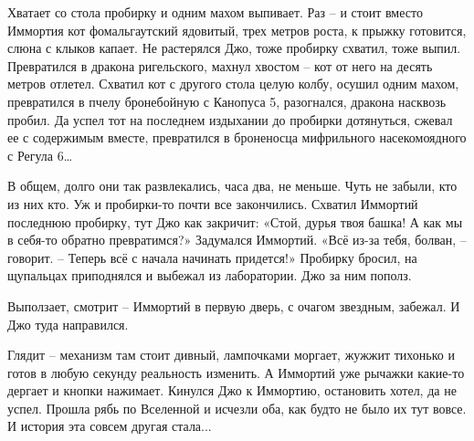 \documentclass[ebook,oneside,final,openright]{memoir}
\begin{document}
\par
Хватает со стола пробирку и одним махом выпивает. Раз – и стоит вместо Иммортия кот фомальгаутский ядовитый, трех метров роста, к прыжку готовится, слюна с клыков капает. Не растерялся Джо, тоже пробирку схватил, тоже выпил. Превратился в дракона ригельского, махнул хвостом – кот от него на десять метров отлетел. Схватил кот с другого стола целую колбу, осушил одним махом, превратился в пчелу бронебойную с Канопуса 5, разогнался, дракона насквозь пробил. Да успел тот на последнем издыхании до пробирки дотянуться, сжевал ее с содержимым вместе, превратился в броненосца мифрильного насекомоядного с Регула 6…\par
\par
В общем, долго они так развлекались, часа два, не меньше. Чуть не забыли, кто из них кто. Уж и пробирки-то почти все закончились. Схватил Иммортий последнюю пробирку, тут Джо как закричит: «Стой, дурья твоя башка! А как мы в себя-то обратно превратимся?» Задумался Иммортий. «Всё из-за тебя, болван, – говорит. – Теперь всё с начала начинать придется!» Пробирку бросил, на щупальцах приподнялся и выбежал из лаборатории. Джо за ним пополз.\par
\par
Выползает, смотрит – Иммортий в первую дверь, с очагом звездным, забежал. И Джо туда направился.\par
\par
Глядит – механизм там стоит дивный, лампочками моргает, жужжит тихонько и готов в любую секунду реальность изменить. А Иммортий уже рычажки какие-то дергает и кнопки нажимает. Кинулся Джо к Иммортию, остановить хотел, да не успел. Прошла рябь по Вселенной и исчезли оба, как будто не было их тут вовсе. И история эта совсем другая стала...\par
\end{document}
